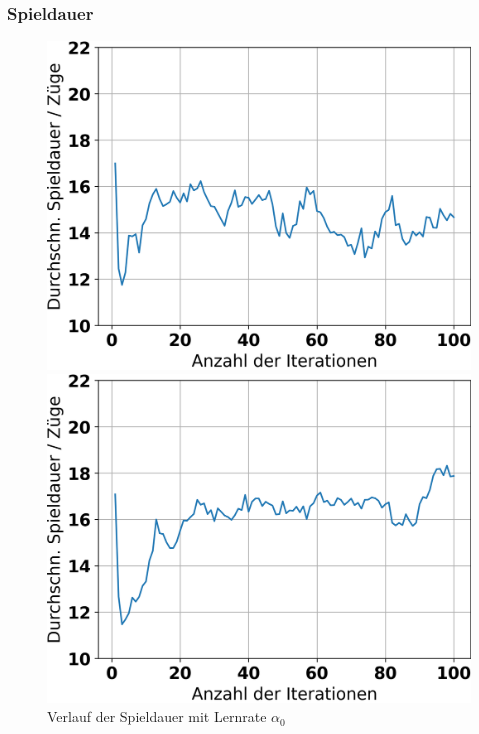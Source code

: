 \subsubsection{Spieldauer}

\begin{figure}[H]
	\begin{minipage}[c]{0.32\linewidth}
		\includegraphics[width=\linewidth]{Bilder/ensemble-training/a_0_001/graph_game_lengths.png}
		\caption{Verlauf der Spieldauer mit Lernrate $\alpha_0$}
	\end{minipage}
	\hfill
	\begin{minipage}[c]{0.32\linewidth}
		\includegraphics[width=\linewidth]{Bilder/ensemble-training/b_0_0003/graph_game_lengths.png}

\end{minipage}
\end{figure}
